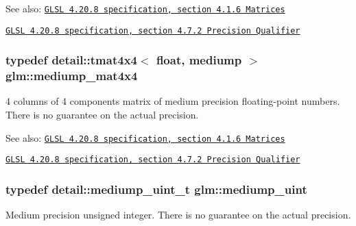 \begin{Desc}
\item[See also:]\href{http://www.opengl.org/registry/doc/GLSLangSpec.4.20.8.pdf}{\tt GLSL 4.20.8 specification, section 4.1.6 Matrices} 

\href{http://www.opengl.org/registry/doc/GLSLangSpec.4.20.8.pdf}{\tt GLSL 4.20.8 specification, section 4.7.2 Precision Qualifier} \end{Desc}
\hypertarget{group__core__precision_gcb51d2d10f7607617ac544f6db9a6eef}{
\subsubsection[mediump\_\-mat4x4]{\setlength{\rightskip}{0pt plus 5cm}typedef detail::tmat4x4$<$ float, mediump $>$ {\bf glm::mediump\_\-mat4x4}}}
\label{group__core__precision_gcb51d2d10f7607617ac544f6db9a6eef}


4 columns of 4 components matrix of medium precision floating-point numbers. There is no guarantee on the actual precision.

\begin{Desc}
\item[See also:]\href{http://www.opengl.org/registry/doc/GLSLangSpec.4.20.8.pdf}{\tt GLSL 4.20.8 specification, section 4.1.6 Matrices} 

\href{http://www.opengl.org/registry/doc/GLSLangSpec.4.20.8.pdf}{\tt GLSL 4.20.8 specification, section 4.7.2 Precision Qualifier} \end{Desc}
\hypertarget{group__core__precision_g08ae38ad78ade3539fdd1d25052b8c51}{
\subsubsection[mediump\_\-uint]{\setlength{\rightskip}{0pt plus 5cm}typedef detail::mediump\_\-uint\_\-t {\bf glm::mediump\_\-uint}}}
\label{group__core__precision_g08ae38ad78ade3539fdd1d25052b8c51}


Medium precision unsigned integer. There is no guarantee on the actual precision.

